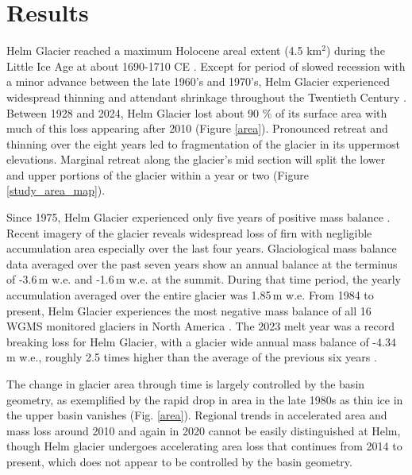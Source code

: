 \documentclass[annals,review,oneside]{igs}
\begin{document}
\section{Results}

Helm Glacier reached a maximum Holocene areal extent (4.5 km$^{2}$) during the Little Ice Age at about 1690-1710 CE \citep{Koch2009}. Except for period of slowed recession with a minor advance between the late 1960’s and 1970’s, Helm Glacier experienced widespread thinning and attendant shrinkage throughout the Twentieth Century \citep{Koch2009}. Between 1928 and 2024, Helm Glacier lost about 90 \% of its surface area with much of this loss appearing after 2010 (Figure \ref{area}). Pronounced retreat and thinning over the eight years led to fragmentation of the glacier in its uppermost elevations.  Marginal retreat along the glacier's mid section will split the lower and upper portions of the glacier within a year or two (Figure \ref{study_area_map}). 

Since 1975, Helm Glacier experienced only five years of positive mass balance \citep{WGMS2024}. Recent imagery of the glacier reveals widespread loss of firn with negligible accumulation area especially over the last four years. Glaciological mass balance data averaged over the past seven years show an annual balance at the terminus of -3.6\,m w.e. and -1.6\,m w.e. at the summit. During that time period, the yearly accumulation averaged over the entire glacier was 1.85\,m w.e. From 1984 to present, Helm Glacier experiences the most negative mass balance of all 16 WGMS monitored glaciers in North America \citep{WGMS2024}. The 2023 melt year was a record breaking loss for Helm Glacier, with a glacier wide annual mass balance of -4.34\, m w.e., roughly 2.5 times higher than the average of the previous six years \citep{Menounos2025}. 

The change in glacier area through time is largely controlled by the basin geometry, as exemplified by the rapid drop in area in the late 1980s as thin ice in the upper basin vanishes (Fig. \ref{area}). Regional trends in accelerated area and mass loss around 2010 \citep{Bevington2022,Menounos2019} and again in 2020 \citep{Menounos2025} cannot be easily distinguished at Helm, though Helm glacier undergoes accelerating area loss that continues from 2014 to present, which does not appear to be controlled by the basin geometry. 
\end{document}
